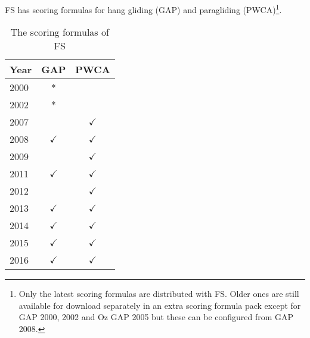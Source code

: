 \documentclass[gap.tex]{subfiles}
\begin{document}
FS has scoring formulas for hang gliding (GAP) and paragliding
(PWCA)\footnote{Only the latest scoring formulas are distributed with FS.
Older ones are still available for download separately in an extra scoring
formula pack except for GAP 2000, 2002 and Oz GAP 2005 but these can be
configured from GAP 2008.}.
\begin{table}[!ht]
    \centering
    \begin{tabularx}{0.25\textwidth}{Xcc}
    \hline
         \textbf{Year}
         & \textbf{GAP}
         & \textbf{PWCA}
         \\
    \hline
        2000
        & *
        &
        \\
    \hline
        2002
        & *
        &
        \\
    \hline
        2007
        &
        & $\checkmark$
        \\
    \hline
        2008
        & $\checkmark$
        & $\checkmark$
        \\
    \hline
        2009
        &
        & $\checkmark$
        \\
    \hline
        2011
        & $\checkmark$
        & $\checkmark$
        \\
    \hline
        2012
        &
        & $\checkmark$
        \\
    \hline
        2013
        & $\checkmark$
        & $\checkmark$
        \\
    \hline
        2014
        & $\checkmark$
        & $\checkmark$
        \\
    \hline
        2015
        & $\checkmark$
        & $\checkmark$
        \\
    \hline
        2016
        & $\checkmark$
        & $\checkmark$
        \\
    \hline
    \end{tabularx}
    \caption{The scoring formulas of FS}
    \label{tab:fs-gap-versions}
\end{table}
\end{document}
